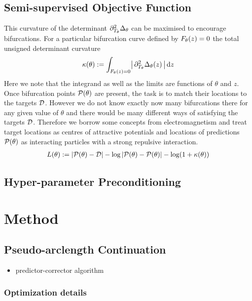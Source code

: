 \subsection{Semi-supervised Objective Function}

This curvature of the determinant $\partial_{T_{\theta}}^2\Delta_{\theta}$ can be maximised to encourage bifurcations. For a particular bifurcation curve defined by $F_{\theta}(z)=0$ the total unsigned determinant curvature
\begin{align}
    \kappa(\theta) := \int_{F_{\theta}(z)=0}\!
    \big|\,\partial_{T_{\theta}}^2\Delta_{\theta}(z)\,\big|
    \,\mathrm{d}z
\end{align}
Here we note that the integrand as well as the limits are functions of $\theta$ and $z$. Once bifurcation points $\mathcal{P}(\theta)$ are present, the task is to match their locations to the targets $\mathcal{D}$. However we do not know exactly now many bifurcations there for any given value of $\theta$ and there would be many different ways of satisfying the targets $\mathcal{D}$. Therefore we borrow some concepts from electromagnetism and treat target locations as centres of attractive potentials and locations of predictions $\mathcal{P}(\theta)$ as interacting particles with a strong repulsive interaction.
\begin{align}
    L(\theta):= |\mathcal{P}(\theta)-\mathcal{D}|
    -\log|\mathcal{P}(\theta)-\mathcal{P}(\theta)|
    -\log(1+\kappa(\theta))
\end{align}

\subsection{Hyper-parameter Preconditioning}


\section{Method}

\subsection{Pseudo-arclength Continuation}
\label{sec:continuation}

\begin{itemize}
    \item predictor-corrector algorithm
    \end{itemize}

\subsubsection{Optimization details}

